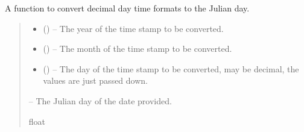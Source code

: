 \documentclass[letterpaper,11pt,english]{sphinxmanual}
\begin{document}
\begin{savenotes}\begin{fulllineitems}
\label{\detokenize{code/opihiexarata.library.conversion:opihiexarata.library.conversion.decimal_day_to_julian_day}}
\pysigstartsignatures
{}
\pysigstopsignatures
\sphinxAtStartPar
A function to convert decimal day time formats to the Julian day.
\begin{quote}\begin{description}
\begin{itemize}
\item {} 
\sphinxAtStartPar
{} () – The year of the time stamp to be converted.

\item {} 
\sphinxAtStartPar
{} () – The month of the time stamp to be converted.

\item {} 
\sphinxAtStartPar
{} () – The day of the time stamp to be converted, may be decimal, the
values are just passed down.

\end{itemize}

\sphinxAtStartPar
{} – The Julian day of the date provided.

\sphinxAtStartPar
float

\end{description}\end{quote}

\end{fulllineitems}\end{savenotes}

\end{document}
